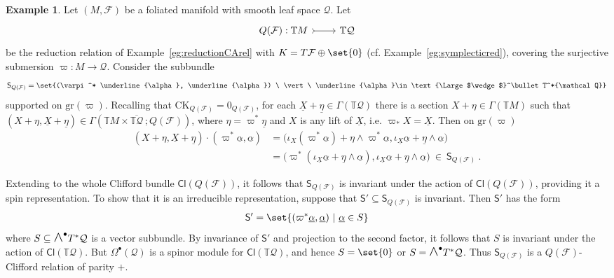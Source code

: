 \documentclass[a4paper, reqno, 11pt]{amsart}
\numberwithin{equation}{section}
\theoremstyle{definition}
\newtheorem{example}[equation]{Example}
\newcommand{\sfgamma}{\mathsf{\Gamma}}
\newcommand{\red}[1]{\underline{#1}}
\newcommand{\IT}{\mathbb{T}}
\newcommand{\Cl}{\mathsf{Cl}}
\newcommand{\cQ}{{\mathcal Q}}
\newcommand{\cF}{{\mathcal F}}
\newcommand{\sfS}{{\mathsf{S}}}
\newcommand{\sfGamma}{{\mathsf{\Gamma}}}
\newcommand{\sfOmega}{{\mathsf{\Omega}}}
\newcommand{\midwedge}{\text {\Large$\wedge$}}
\newcommand{\gr}{\text{gr}}
\theoremstyle{remark}
\begin{document}
\begin{example}\label{ex:pullbackspinorrel}
    Let $(M,\cF)$ be a foliated manifold with smooth leaf space $\cQ$. Let 
\begin{equation}
\begin{tikzcd}
Q(\cF): \IT M \ar[r, rightarrowtail] & \IT \cQ
\end{tikzcd}
\end{equation}
be the reduction relation of Example~\ref{eg:reductionCArel} with $K=T\cF\oplus\set{0}$ (cf. Example~\ref{eg:symplecticred}), covering the surjective submersion $\varpi \colon M \to \cQ$. Consider the subbundle
    \begin{align}
        \sfS_{Q(\cF)} = \set{(\varpi^* \red\alpha, \red\alpha) \ \vert \ \red\alpha \in \midwedge^\bullet T^*\cQ}
    \end{align}
    supported on $\gr(\varpi)$.
    Recalling that $\mathrm{CK}_{Q(\cF)}=0_{Q(\cF)}$, for each $ \red X + \red\eta\in \sfgamma(\IT \cQ)$ there is a section $ X + \eta \in \sfgamma(\IT M)$ such that $( X+\eta,\red X + \red\eta) \in \sfGamma(\IT M \times \overline {\IT\cQ}\,; Q(\cF))$, where $\eta = \varpi^*\red\eta$ and $ X$ is any lift of $\red X$, i.e. $\varpi_*  X = \red X$. Then on $\gr(\varpi)$
    \begin{align}
        ( X+\eta, \red X + \red\eta) \cdot(\varpi^* \red\alpha , \red\alpha) &= \big(\iota_{ X} (\varpi^*  \red\alpha) + \eta \wedge \varpi^* \red\alpha,\iota_{\red X}\red\alpha +\red\eta \wedge \red\alpha\big) \\[4pt]
        &=\big(\varpi^*(\iota_{\red X} \red\alpha +\red\eta\wedge \red\alpha),\iota_{\red X} \red\alpha +\red\eta\wedge \red\alpha\big) \ \in \ \sfS_{Q(\cF)} \ .
    \end{align}
    
    Extending to the whole Clifford bundle $\Cl(Q(\cF))$, it follows that $\sfS_{Q(\cF)}$ is invariant under the action of $\Cl(Q(\cF))$, providing it a spin representation. To show that it is an irreducible representation, suppose that $\sfS' \subseteq \sfS_{Q(\cF)}$ is invariant. Then $\sfS'$ has the form
    \begin{align}
        \sfS' = \set{(\varpi^* \red\alpha, \red\alpha) \ \vert \ \red\alpha \in S}
    \end{align}
where $S \subseteq \midwedge^\bullet T^*\cQ$ is a vector subbundle. By invariance of $\sfS'$ and projection to the second factor, it follows that $S$ is invariant under the action of $\Cl(\IT \cQ)$. But $\sfOmega^\bullet(\cQ)$ is a spinor module for $\Cl(\IT \cQ)$, and hence $S = \set{0}$ or $S=\midwedge^\bullet T^*\cQ$. Thus $\sfS_{Q(\cF)}$ is a $Q(\cF)$-Clifford relation of parity $+$.
\end{example}
\end{document}
